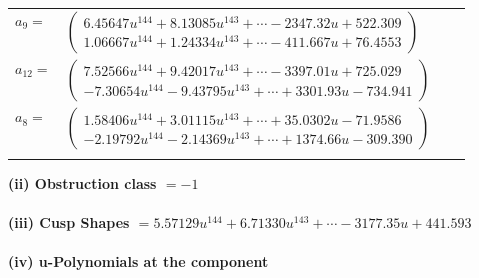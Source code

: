 \documentclass[1p]{elsarticle_modified}
\theoremstyle{definition}
\begin{document}
\begin{tabular}{m{7pt} m{180pt} m{7pt} m{180pt} }
\flushright $a_{9}=$&$\begin{pmatrix}6.45647 u^{144}+8.13085 u^{143}+\cdots-2347.32 u+522.309\\1.06667 u^{144}+1.24334 u^{143}+\cdots-411.667 u+76.4553\end{pmatrix}$ \\
\flushright $a_{12}=$&$\begin{pmatrix}7.52566 u^{144}+9.42017 u^{143}+\cdots-3397.01 u+725.029\\-7.30654 u^{144}-9.43795 u^{143}+\cdots+3301.93 u-734.941\end{pmatrix}$ \\
\flushright $a_{8}=$&$\begin{pmatrix}1.58406 u^{144}+3.01115 u^{143}+\cdots+35.0302 u-71.9586\\-2.19792 u^{144}-2.14369 u^{143}+\cdots+1374.66 u-309.390\end{pmatrix}$\\&\end{tabular}
\flushleft \textbf{(ii) Obstruction class $= -1$}\\~\\
\flushleft \textbf{(iii) Cusp Shapes $= 5.57129 u^{144}+6.71330 u^{143}+\cdots-3177.35 u+441.593$}\\~\\
\newpage\renewcommand{\arraystretch}{1}
\flushleft \textbf{(iv) u-Polynomials at the component}\newline \\
\end{document}
